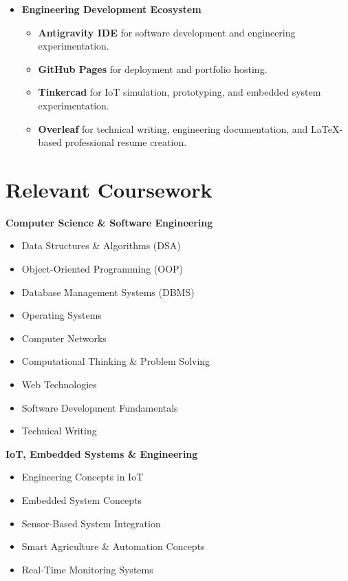 \documentclass[a4paper,11pt]{article}
\begin{document}
\begin{itemize}[leftmargin=0.15in]
\item \textbf{Engineering Development Ecosystem}
\begin{itemize}
    \item \textbf{Antigravity IDE} for software development and engineering experimentation.
    
    \item \textbf{GitHub Pages} for deployment and portfolio hosting.
    
    \item \textbf{Tinkercad} for IoT simulation, prototyping, and embedded system experimentation.
    
    \item \textbf{Overleaf} for technical writing, engineering documentation, and LaTeX-based professional resume creation.
\end{itemize}

\end{itemize}





\section{Relevant Coursework}

\textbf{Computer Science \& Software Engineering}
\begin{itemize}
    \item Data Structures \& Algorithms (DSA)
    \item Object-Oriented Programming (OOP)
    \item Database Management Systems (DBMS)
    \item Operating Systems
    \item Computer Networks
    \item Computational Thinking \& Problem Solving
    \item Web Technologies
    \item Software Development Fundamentals
    \item Technical Writing
\end{itemize}

\vspace{4pt}

\textbf{IoT, Embedded Systems \& Engineering}
\begin{itemize}
    \item Engineering Concepts in IoT
    \item Embedded System Concepts
    \item Sensor-Based System Integration
    \item Smart Agriculture \& Automation Concepts
    \item Real-Time Monitoring Systems
\end{itemize}
\end{document}
